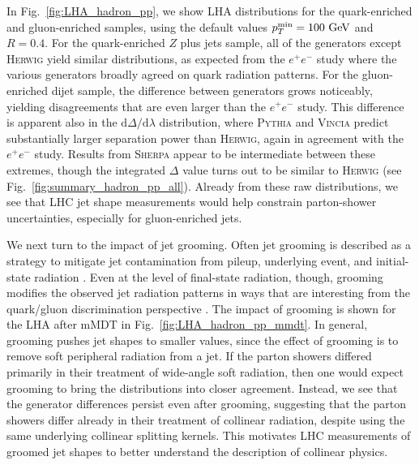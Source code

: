 \documentclass[11pt,letterpaper]{article}
\newcommand{\GeV}{\text{GeV}}
\DeclareRobustCommand{\Fig}[1]{Fig.~\ref{#1}}
\begin{document}
In \Fig{fig:LHA_hadron_pp}, we show LHA distributions for the quark-enriched and gluon-enriched samples, using the default values $p_T^{\rm min} = 100~\GeV$ and $R = 0.4$.  For the quark-enriched $Z$ plus jets sample, all of the generators except \textsc{Herwig} yield similar distributions, as expected from the $e^+e^-$ study where the various generators broadly agreed on quark radiation patterns.  For the gluon-enriched dijet sample, the difference between generators grows noticeably, yielding disagreements that are even larger than the $e^+e^-$ study.  This difference is apparent also in the $\text{d} \Delta / \text{d} \lambda$ distribution, where \textsc{Pythia} and \textsc{Vincia} predict substantially larger separation power than \textsc{Herwig}, again in agreement with the $e^+e^-$ study.  Results from \textsc{Sherpa} appear to be intermediate between these extremes, though the integrated $\Delta$ value turns out to be similar to \textsc{Herwig} (see \Fig{fig:summary_hadron_pp_all}).  Already from these raw distributions, we see that LHC jet shape measurements would help constrain parton-shower uncertainties, especially for gluon-enriched jets.

We next turn to the impact of jet grooming.  Often jet grooming is described as a strategy to mitigate jet contamination from pileup, underlying event, and initial-state radiation \cite{Butterworth:2008iy,Ellis:2009su,Ellis:2009me,Krohn:2009th}.  Even at the level of final-state radiation, though, grooming modifies the observed jet radiation patterns in ways that are interesting from the quark/gluon discrimination perspective \cite{Dasgupta:2013ihk,Larkoski:2014wba}.  The impact of grooming is shown for the LHA after mMDT in \Fig{fig:LHA_hadron_pp_mmdt}.   In general, grooming pushes jet shapes to smaller values, since the effect of grooming is to remove soft peripheral radiation from a jet.  If the parton showers differed primarily in their treatment of wide-angle soft radiation, then one would expect grooming to bring the distributions into closer agreement.  Instead, we see that the generator differences persist even after grooming, suggesting that the parton showers differ already in their treatment of collinear radiation, despite using the same underlying collinear splitting kernels.  This motivates LHC measurements of groomed jet shapes to better understand the description of collinear physics.
\end{document}
